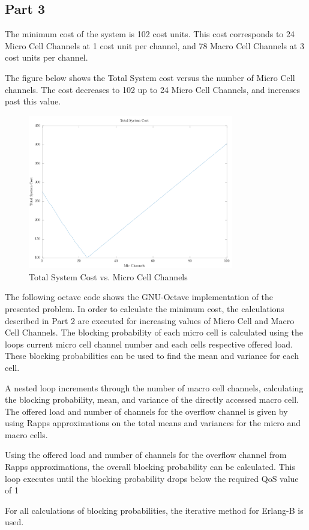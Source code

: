 \subsection{Part 3}

The minimum cost of the system is 102 cost units. This cost
corresponds to 24 Micro Cell Channels at 1 cost unit per channel, and 78 Macro
Cell Channels at 3 cost units per channel.

The figure below shows the Total System cost versus the number of Micro Cell
channels. The cost decreases to 102 up to 24 Micro Cell Channels, and increases
past this value.

\begin{figure}[H]
	\centering
	\includegraphics[width=0.8\textwidth]{code/Q6/Q6}
	\caption{Total System Cost vs. Micro Cell Channels}
	\label{fig:code-Q6-Q6}
\end{figure}

The following octave code shows the GNU-Octave implementation of the presented
problem. In order to calculate the minimum cost, the calculations described in
Part 2 are executed for increasing values of Micro Cell and Macro Cell Channels.
The blocking probability of each micro cell is calculated using the loops
current micro cell channel number and each cells respective offered load. These
blocking probabilities can be used to find the mean and variance for each cell.

A nested loop increments through the number of macro cell channels, calculating
the blocking probability, mean, and variance of the directly accessed macro
cell. The offered load and number of channels for the overflow channel is given
by using Rapps approximations on the total means and variances for the micro and
macro cells.

Using the offered load and number of channels for the overflow channel from
Rapps approximations, the overall blocking probability can be calculated. This
loop executes until the blocking probability drops below the required
QoS value of 1%

For all calculations of blocking probabilities, the iterative method for
Erlang-B is used.


